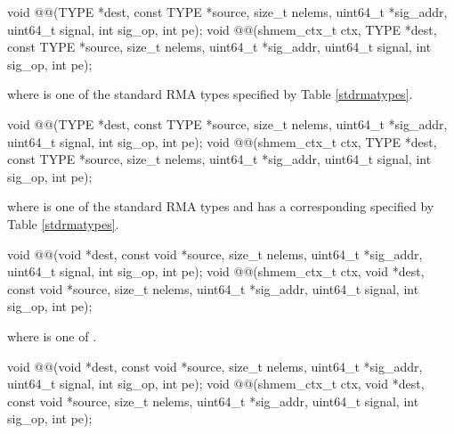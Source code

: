 
\begin{apidefinition}

\begin{C11synopsis}
void @@(TYPE *dest, const TYPE *source, size_t nelems, uint64_t *sig_addr, uint64_t signal, int sig_op, int pe);
void @@(shmem_ctx_t ctx, TYPE *dest, const TYPE *source, size_t nelems, uint64_t *sig_addr, uint64_t signal, int sig_op, int pe);
\end{C11synopsis}
where \TYPE{} is one of the standard \ac{RMA} types specified by Table \ref{stdrmatypes}.

\begin{Csynopsis}
void @@(TYPE *dest, const TYPE *source, size_t nelems, uint64_t *sig_addr, uint64_t signal, int sig_op, int pe);
void @@(shmem_ctx_t ctx, TYPE *dest, const TYPE *source, size_t nelems, uint64_t *sig_addr, uint64_t signal, int sig_op, int pe);
\end{Csynopsis}
where \TYPE{} is one of the standard \ac{RMA} types and has a corresponding \TYPENAME{} specified by Table \ref{stdrmatypes}.

\begin{CsynopsisCol}
void @@(void *dest, const void *source, size_t nelems, uint64_t *sig_addr, uint64_t signal, int sig_op, int pe);
void @@(shmem_ctx_t ctx, void *dest, const void *source, size_t nelems, uint64_t *sig_addr, uint64_t signal, int sig_op, int pe);
\end{CsynopsisCol}
where \SIZE{} is one of .

\begin{CsynopsisCol}
void @@(void *dest, const void *source, size_t nelems, uint64_t *sig_addr, uint64_t signal, int sig_op, int pe);
void @@(shmem_ctx_t ctx, void *dest, const void *source, size_t nelems, uint64_t *sig_addr, uint64_t signal, int sig_op, int pe);
\end{CsynopsisCol}


\end{apidefinition}
